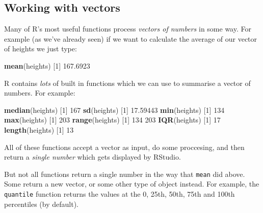 \documentclass[]{article}
\newenvironment{Shaded}{\begin{snugshade}}{\end{snugshade}}
\newcommand{\DecValTok}[1]{\textcolor[rgb]{0.00,0.00,0.81}{#1}}
\newcommand{\FloatTok}[1]{\textcolor[rgb]{0.00,0.00,0.81}{#1}}
\newcommand{\KeywordTok}[1]{\textcolor[rgb]{0.13,0.29,0.53}{\textbf{#1}}}
\newcommand{\NormalTok}[1]{#1}
\newcommand{\OperatorTok}[1]{\textcolor[rgb]{0.81,0.36,0.00}{\textbf{#1}}}
\newcommand{\StringTok}[1]{\textcolor[rgb]{0.31,0.60,0.02}{#1}}
\begin{document}
\hypertarget{working-with-vectors}{%
\subsection*{Working with vectors}\label{working-with-vectors}}

Many of R's most useful functions process \emph{vectors of numbers} in some way. For
example (as we've already seen) if we want to calculate the average of our
vector of heights we just type:

\begin{Shaded}
\begin{Highlighting}[]
\KeywordTok{mean}\NormalTok{(heights)}
\NormalTok{[}\DecValTok{1}\NormalTok{] }\FloatTok{167.6923}
\end{Highlighting}
\end{Shaded}

R contains \emph{lots} of built in functions which we can use to summarise a vector
of numbers. For example:

\begin{Shaded}
\begin{Highlighting}[]
\KeywordTok{median}\NormalTok{(heights)}
\NormalTok{[}\DecValTok{1}\NormalTok{] }\DecValTok{167}
\KeywordTok{sd}\NormalTok{(heights)}
\NormalTok{[}\DecValTok{1}\NormalTok{] }\FloatTok{17.59443}
\KeywordTok{min}\NormalTok{(heights)}
\NormalTok{[}\DecValTok{1}\NormalTok{] }\DecValTok{134}
\KeywordTok{max}\NormalTok{(heights)}
\NormalTok{[}\DecValTok{1}\NormalTok{] }\DecValTok{203}
\KeywordTok{range}\NormalTok{(heights)}
\NormalTok{[}\DecValTok{1}\NormalTok{] }\DecValTok{134} \DecValTok{203}
\KeywordTok{IQR}\NormalTok{(heights)}
\NormalTok{[}\DecValTok{1}\NormalTok{] }\DecValTok{17}
\KeywordTok{length}\NormalTok{(heights)}
\NormalTok{[}\DecValTok{1}\NormalTok{] }\DecValTok{13}
\end{Highlighting}
\end{Shaded}

All of these functions accept a vector as input, do some proccesing, and then
return a \emph{single number} which gets displayed by RStudio.

But not all functions return a single number in the way that \texttt{mean} did above.
Some return a new vector, or some other type of object instead. For example, the
\texttt{quantile} function returns the values at the 0, 25th, 50th, 75th and 100th
percentiles (by default).

\begin{Shaded}
\end{Shaded}
\end{document}
